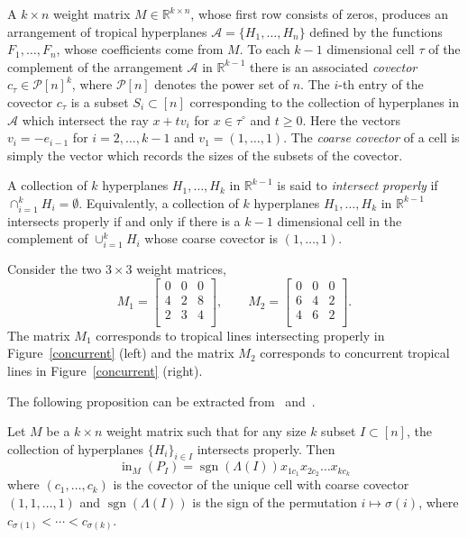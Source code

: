 \documentclass[ALCO,ThmDefs,Unicode,epreuves]{cedram}
\DeclareMathOperator{\ini}{in}
\DeclareMathOperator{\sgn}{sgn}
\begin{document}
A $k \times n$ weight matrix $M \in \mathbb{R}^{k \times n}$, whose first row consists of zeros, produces an arrangement of tropical hyperplanes $\mathcal{A} = \{ H_1, \ldots , H_n\}$ defined by the functions $F_1, \ldots , F_n$, whose coefficients come from $M$. 
To each $k-1$ dimensional cell $\tau$ of the complement of the arrangement $\mathcal{A}$ in $\mathbb{R}^{k-1}$ there is an associated \emph{covector} $c_{\tau} \in \mathcal{P}[n]^k$, where $\mathcal{P}[n]$ denotes the power set of $n$. 
The $i$-th entry of the covector $c_{\tau}$ is a subset $S_i \subset [n]$ corresponding to the collection of hyperplanes in $\mathcal{A}$ which intersect the ray $x + tv_i$ for $x \in \tau^{\circ}$ and $t \geq 0$. Here the vectors $v_i = -e_{i-1}$ for $i = 2, \ldots, k-1$ and $v_1 = (1, \ldots, 1)$. The \emph{coarse covector}
of a cell is simply the vector which records the sizes of the subsets of the covector. 


\begin{Definition}
A collection of $k$ hyperplanes $H_1, \ldots, H_k$ in $\mathbb{R}^{k-1}$ is said to \emph{intersect properly} if $\cap_{i = 1}^k H_i = \emptyset$.
Equivalently, a collection of $k$ hyperplanes $H_1, \ldots, H_k$ in $\mathbb{R}^{k-1}$ intersects properly if and only if there is a $k-1$ dimensional cell in the complement of $\cup_{i = 1}^k H_i$ 
whose coarse covector is $(1, \ldots, 1)$. 
\end{Definition}

\begin{exam}
Consider the two $3 \times 3$ weight matrices, 
\[
M_1=\begin{bmatrix}
 0 & 0 & 0 \\
 4& 2 & 8 \\
 2& 3 & 4 \\
\end{bmatrix},
\qquad 
M_2=\begin{bmatrix}
 0 & 0 & 0 \\
 6 & 4 & 2 \\
 4 & 6 & 2 \\
\end{bmatrix}.
\]
The matrix $M_1$ corresponds to tropical lines intersecting properly in Figure~\ref{concurrent} (left) and the matrix $M_2$ corresponds to concurrent tropical lines in Figure~\ref{concurrent} (right). 
\end{exam}

The following proposition can be extracted from~\cite[Proposition~2.4]{DevSturm} and~\cite[Propositions~5.11 and~5.12]{fink2015stiefel}. 
\begin{Proposition}\label{prop:initialPlucker}
Let $M$ be a $k \times n$ weight matrix such that for any size $k$ subset $I \subset [n]$, the collection of hyperplanes $\{H_i\}_{i\in I}$ intersects properly. 
Then
\[
\ini_{M} (P_{I}) =\sgn ({\Lambda(I)}) x_{1c_1}x_{2c_2}\ldots x_{kc_{k}}
\]
where $(c_1, \ldots, c_{k})$ is the covector of the unique cell with coarse covector $(1, 1, \ldots, 1)$ and 
$\sgn ({\Lambda(I)})$ is the sign of the permutation $i \mapsto \sigma(i)$, where $c_{\sigma(1)}<\cdots<c_{\sigma({k})}$.
\end{Proposition}
\end{document}
